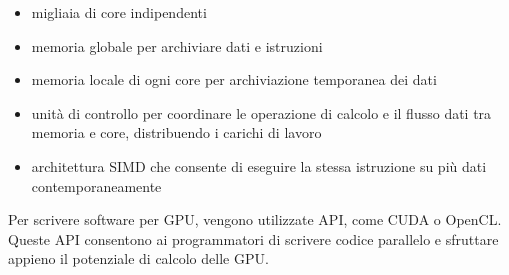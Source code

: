 \begin{itemize}
    \item migliaia di core indipendenti
    \item memoria globale per archiviare dati e istruzioni
    \item memoria locale di ogni core per archiviazione temporanea dei dati
    \item unità di controllo per coordinare le operazione di calcolo e il flusso dati tra memoria e core, distribuendo i carichi di lavoro
    \item architettura SIMD che consente di eseguire la stessa istruzione su più dati contemporaneamente
\end{itemize}

Per scrivere software per GPU, vengono utilizzate API, come CUDA o OpenCL. Queste API consentono ai programmatori di scrivere codice parallelo e sfruttare appieno il potenziale di calcolo delle GPU.















